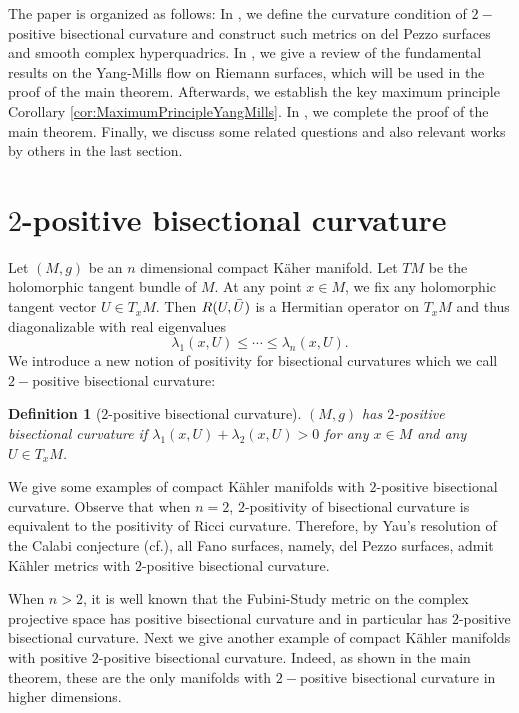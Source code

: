 \documentclass[11pt]{amsart}
\theoremstyle{plain}
\newtheorem{defn}[thm]{Definition}
\theoremstyle{definition}
\numberwithin{equation}{section}
\begin{document}
The paper is organized as follows: In , we define the curvature condition of $2-$positive bisectional curvature and construct such metrics on del Pezzo surfaces and smooth complex hyperquadrics. In , we give a review of the fundamental results on the Yang-Mills flow on Riemann surfaces, which will be used in the proof of the main theorem. Afterwards, we establish the key maximum principle Corollary \ref{cor:MaximumPrincipleYangMills}. In , we complete the proof of the main theorem. Finally, we discuss some related questions and also relevant works by others in the last section.


\section{$2$-positive bisectional curvature}\label{Sec:2PositiveBisectionalCurvature}

Let $(M,g)$ be an $n$ dimensional compact K\"{a}her manifold. Let $TM$ be the holomorphic tangent bundle of $M$. At any point $x\in M$, we fix any holomorphic tangent vector $U\in T_xM$. Then $R(U,\Bar{U})$ is a Hermitian operator on $T_xM$ and thus diagonalizable with real eigenvalues 
\[\lambda_1(x,U)\leq\cdots\leq\lambda_n(x,U).\]
We introduce a new notion of positivity for bisectional curvatures which we call $2-$positive bisectional curvature:

\begin{defn}[$2$-positive bisectional curvature]\label{defn:2PositiveBisectionalCurvature}
    $(M,g)$ has $2$-positive bisectional curvature if $\lambda_1(x,U)+\lambda_2(x,U)>0$ for any $x\in M$ and any $U\in T_xM$. 
\end{defn}

We give some examples of compact K\"{a}hler manifolds with $2$-positive bisectional curvature. Observe that when $n=2$, $2$-positivity of bisectional curvature is equivalent to the positivity of Ricci curvature. Therefore, by Yau's resolution of the Calabi conjecture (cf.\cite{Yau78}), all Fano surfaces, namely, del Pezzo surfaces, admit K\"{a}hler metrics with $2$-positive bisectional curvature.

When $n>2$, it is well known that the Fubini-Study metric on the complex projective space has positive bisectional curvature and in particular has $2$-positive bisectional curvature. Next we give another example of compact K\"{a}hler manifolds with positive $2$-positive bisectional curvature. Indeed, as shown in the main theorem, these are the only manifolds with $2-$positive bisectional curvature in higher dimensions.
\end{document}
